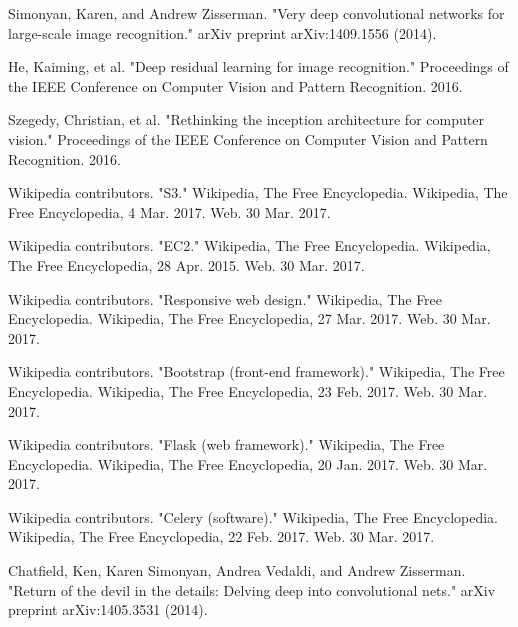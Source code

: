 \documentclass[conference]{IEEEtran}
\begin{document}
\begin{thebibliography}{1}

Simonyan, Karen, and Andrew Zisserman. "Very deep convolutional networks for large-scale image recognition." arXiv preprint arXiv:1409.1556 (2014).

He, Kaiming, et al. "Deep residual learning for image recognition." Proceedings of the IEEE Conference on Computer Vision and Pattern Recognition. 2016.

Szegedy, Christian, et al. "Rethinking the inception architecture for computer vision." Proceedings of the IEEE Conference on Computer Vision and Pattern Recognition. 2016.

Wikipedia contributors. "S3." Wikipedia, The Free Encyclopedia. Wikipedia, The Free Encyclopedia, 4 Mar. 2017. Web. 30 Mar. 2017.

Wikipedia contributors. "EC2." Wikipedia, The Free Encyclopedia. Wikipedia, The Free Encyclopedia, 28 Apr. 2015. Web. 30 Mar. 2017.

Wikipedia contributors. "Responsive web design." Wikipedia, The Free Encyclopedia. Wikipedia, The Free Encyclopedia, 27 Mar. 2017. Web. 30 Mar. 2017.

Wikipedia contributors. "Bootstrap (front-end framework)." Wikipedia, The Free Encyclopedia. Wikipedia, The Free Encyclopedia, 23 Feb. 2017. Web. 30 Mar. 2017.

Wikipedia contributors. "Flask (web framework)." Wikipedia, The Free Encyclopedia. Wikipedia, The Free Encyclopedia, 20 Jan. 2017. Web. 30 Mar. 2017.

Wikipedia contributors. "Celery (software)." Wikipedia, The Free Encyclopedia. Wikipedia, The Free Encyclopedia, 22 Feb. 2017. Web. 30 Mar. 2017.

Chatfield, Ken, Karen Simonyan, Andrea Vedaldi, and Andrew Zisserman. "Return of the devil in the details: Delving deep into convolutional nets." arXiv preprint arXiv:1405.3531 (2014).

\end{thebibliography}


\end{document}
